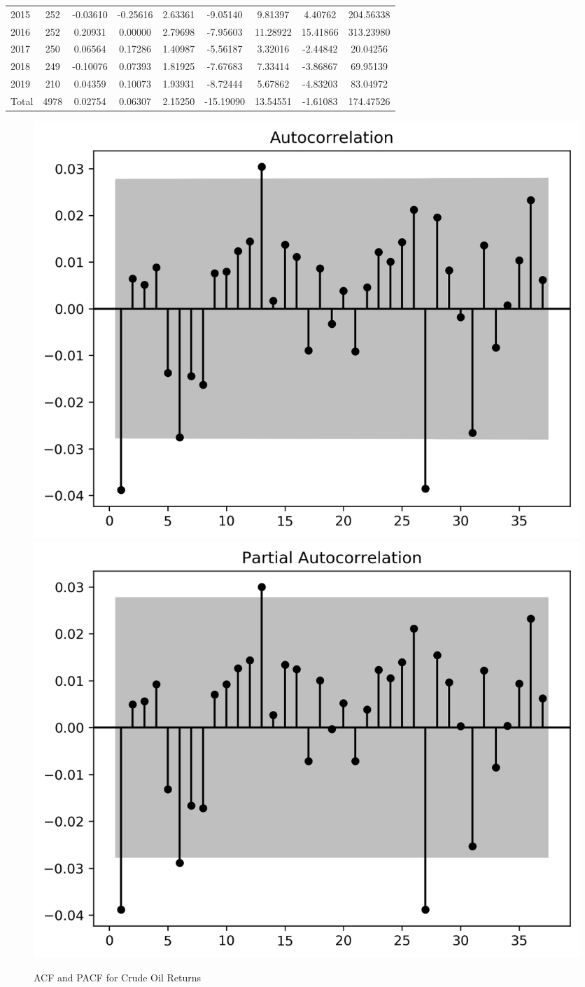 \documentclass[12pt]{article}
\begin{document}
\begin{table}[H]
\begin{tabular}{l|c c c c c c c c}
2015 & 252 & -0.03610 & -0.25616 & 2.63361 & -9.05140 & 9.81397 & 4.40762 & 204.56338 \\
2016 & 252 & 0.20931 & 0.00000 & 2.79698 & -7.95603 & 11.28922 & 15.41866 & 313.23980 \\
2017 & 250 & 0.06564 & 0.17286 & 1.40987 & -5.56187 & 3.32016 & -2.44842 & 20.04256 \\
2018 & 249 & -0.10076 & 0.07393 & 1.81925 & -7.67683 & 7.33414 & -3.86867 & 69.95139 \\
2019 & 210 & 0.04359 & 0.10073 & 1.93931 & -8.72444 & 5.67862 & -4.83203 & 83.04972 \\
			\midrule
Total & 4978 & 0.02754 & 0.06307 & 2.15250 & -15.19090 & 13.54551 & -1.61083 & 174.47526 \\
			\bottomrule
		\end{tabular}
	\end{table}

	\begin{figure}[H]
		\small
		\centering
		\caption{ACF and PACF for Crude Oil Returns}
		\includegraphics[width=0.45\linewidth]{figures/wti_summary/returns_acf.png}
		\includegraphics[width=0.45\linewidth]{figures/wti_summary/returns_pacf.png}
	\end{figure}
	
\end{document}
